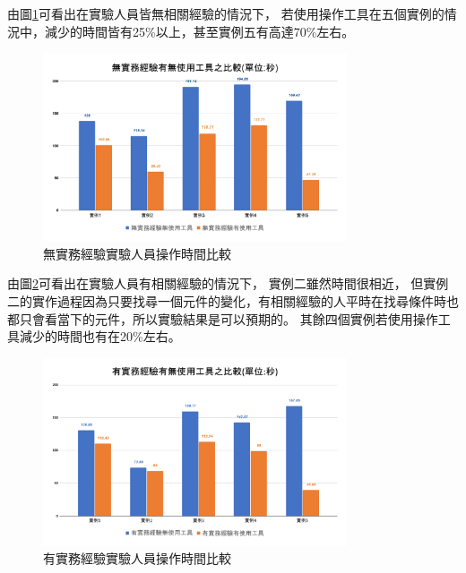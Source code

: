 由圖\ref{f4.7}可看出在實驗人員皆無相關經驗的情況下，
若使用操作工具在五個實例的情況中，減少的時間皆有25\%以上，甚至實例五有高達70\%左右。

\begin{figure}[H]
    \centering
    \includegraphics[width=0.8\textwidth]{picture/experiment/ch4-no_experience_compare.png}
    \caption{無實務經驗實驗人員操作時間比較}
    \label{f4.7}
\end{figure}

由圖\ref{f4.8}可看出在實驗人員有相關經驗的情況下，
實例二雖然時間很相近，
但實例二的實作過程因為只要找尋一個元件的變化，有相關經驗的人平時在找尋條件時也都只會看當下的元件，所以實驗結果是可以預期的。
其餘四個實例若使用操作工具減少的時間也有在20\%左右。


\begin{figure}[H]
    \centering
    \includegraphics[width=0.8\textwidth]{picture/experiment/ch4-have_experience_compare.png}
    \caption{有實務經驗實驗人員操作時間比較}
    \label{f4.8}
\end{figure}

